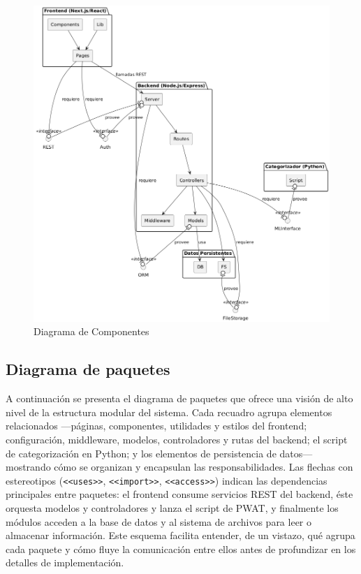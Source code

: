 \begin{figure}[H]
    \centering
    \includegraphics[width=0.7\linewidth]{imagenes/componentes.png}
    \caption{Diagrama de Componentes}
    \label{fig:componentDiagram}
\end{figure}
    
    
    
\subsection{Diagrama de paquetes}
\label{ssc:pack}
    
A continuación se presenta el diagrama de paquetes que ofrece una visión de alto nivel de la estructura modular del sistema. Cada recuadro agrupa elementos relacionados —páginas, componentes, utilidades y estilos del frontend; configuración, middleware, modelos, controladores y rutas del backend; el script de categorización en Python; y los elementos de persistencia de datos— mostrando cómo se organizan y encapsulan las responsabilidades. Las flechas con estereotipos (\texttt{<<uses>>}, \texttt{<<import>>}, \texttt{<<access>>}) indican las dependencias principales entre paquetes: el frontend consume servicios REST del backend, éste orquesta modelos y controladores y lanza el script de PWAT, y finalmente los módulos acceden a la base de datos y al sistema de archivos para leer o almacenar información. Este esquema facilita entender, de un vistazo, qué agrupa cada paquete y cómo fluye la comunicación entre ellos antes de profundizar en los detalles de implementación.

